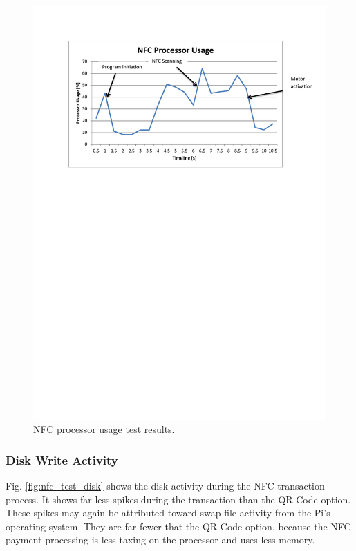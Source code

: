 \begin{figure}
 \centering 
 \includegraphics[clip=true, trim = 0 500 0 70,
 scale=0.7]{nfc_test_cpu}
 \caption{NFC processor usage test results.}
 \label{fig:nfc_test_cpu}
\end{figure}

\subsubsection{Disk Write Activity}

Fig. \ref{fig:nfc_test_disk} shows the disk activity during the NFC transaction process.
It shows far less spikes during the transaction than the QR Code option.  These spikes may
again be attributed toward swap file activity from the Pi's operating system. They are far fewer that the QR Code option, because the NFC payment processing is
less taxing on the processor and uses less memory.

